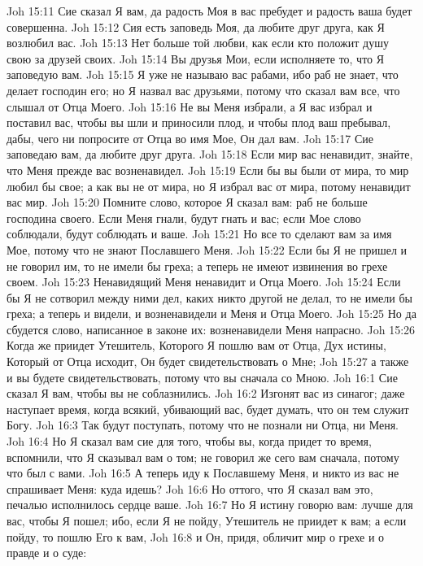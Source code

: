 \vs Joh 15:11 Сие сказал Я вам, да радость Моя в вас пребудет и радость ваша будет совершенна.
\vs Joh 15:12 Сия есть заповедь Моя, да любите друг друга, как Я возлюбил вас.
\vs Joh 15:13 Нет больше той любви, как если кто положит душу свою за друзей своих.
\vs Joh 15:14 Вы друзья Мои, если исполняете то, что Я заповедую вам.
\vs Joh 15:15 Я уже не называю вас рабами, ибо раб не знает, что делает господин его; но Я назвал вас друзьями, потому что сказал вам все, что слышал от Отца Моего.
\vs Joh 15:16 Не вы Меня избрали, а Я вас избрал и поставил вас, чтобы вы шли и приносили плод, и чтобы плод ваш пребывал, дабы, чего ни попросите от Отца во имя Мое, Он дал вам.
\vs Joh 15:17 Сие заповедаю вам, да любите друг друга.
\vs Joh 15:18 Если мир вас ненавидит, знайте, что Меня прежде вас возненавидел.
\vs Joh 15:19 Если бы вы были от мира, то мир любил бы свое; а как вы не от мира, но Я избрал вас от мира, потому ненавидит вас мир.
\vs Joh 15:20 Помните слово, которое Я сказал вам: раб не больше господина своего. Если Меня гнали, будут гнать и вас; если Мое слово соблюдали, будут соблюдать и ваше.
\vs Joh 15:21 Но все то сделают вам за имя Мое, потому что не знают Пославшего Меня.
\vs Joh 15:22 Если бы Я не пришел и не говорил им, то не имели бы греха; а теперь не имеют извинения во грехе своем.
\vs Joh 15:23 Ненавидящий Меня ненавидит и Отца Моего.
\vs Joh 15:24 Если бы Я не сотворил между ними дел, каких никто другой не делал, то не имели бы греха; а теперь и видели, и возненавидели и Меня и Отца Моего.
\vs Joh 15:25 Но да сбудется слово, написанное в законе их: возненавидели Меня напрасно.
\vs Joh 15:26 Когда же приидет Утешитель, Которого Я пошлю вам от Отца, Дух истины, Который от Отца исходит, Он будет свидетельствовать о Мне;
\vs Joh 15:27 а также и вы будете свидетельствовать, потому что вы сначала со Мною.
\vs Joh 16:1 Сие сказал Я вам, чтобы вы не соблазнились.
\vs Joh 16:2 Изгонят вас из синагог; даже наступает время, когда всякий, убивающий вас, будет думать, что он тем служит Богу.
\vs Joh 16:3 Так будут поступать, потому что не познали ни Отца, ни Меня.
\vs Joh 16:4 Но Я сказал вам сие для того, чтобы вы, когда придет то время, вспомнили, что Я сказывал вам о том; не говорил же сего вам сначала, потому что был с вами.
\vs Joh 16:5 А теперь иду к Пославшему Меня, и никто из вас не спрашивает Меня: куда идешь?
\vs Joh 16:6 Но оттого, что Я сказал вам это, печалью исполнилось сердце ваше.
\vs Joh 16:7 Но Я истину говорю вам: лучше для вас, чтобы Я пошел; ибо, если Я не пойду, Утешитель не приидет к вам; а если пойду, то пошлю Его к вам,
\vs Joh 16:8 и Он, придя, обличит мир о грехе и о правде и о суде:
